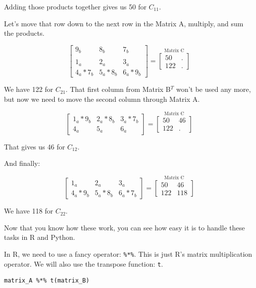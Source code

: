 \documentclass[
  letterpaper,
]{krantz}
\begin{document}
Adding those products together gives us 50 for \(C_{11}\).

Let's move that row down to the next row in the Matrix A, multiply, and
sum the products.

\[
\begin{bmatrix}
9_{b} & 8_{b} & 7_{b} \\
\\
1_{a} & 2_{a} & 3_{a}\\
4_{a}*7_{b} & 5_{a}*8_{b} & 6_{a}*9_{b}
\end{bmatrix}
= 
\stackrel{\mbox{Matrix C}}{
\begin{bmatrix}
50 & .\\
122 & .
\end{bmatrix}
}
\]

We have 122 for \(C_{21}\). That first column from Matrix B\(^T\) won't
be used any more, but now we need to move the second column through
Matrix A.

\[
\begin{bmatrix}
1_{a}*9_{b} & 2_{a}*8_{b} & 3_{a}*7_{b}\\
4_{a} & 5_{a} & 6_{a}
\end{bmatrix}
= 
\stackrel{\mbox{Matrix C}}{
\begin{bmatrix}
50 & 46\\
122 & .
\end{bmatrix}
}
\]

That gives us 46 for \(C_{12}\).

And finally:

\[
\begin{bmatrix}
1_{a} & 2_{a} & 3_{a}\\
4_{a}*9_{b} & 5_{a}*8_{b} & 6_{a}*7_{b}
\end{bmatrix}
=
\stackrel{\mbox{Matrix C}}{
\begin{bmatrix}
50 & 46\\
122 & 118
\end{bmatrix}
}
\]

We have 118 for \(C_{22}\).

Now that you know how these work, you can see how easy it is to handle
these tasks in R and Python.

In R, we need to use a fancy operator: \texttt{\%*\%}. This is just R's
matrix multiplication operator. We will also use the transpose function:
\texttt{t}.

\begin{verbatim}
matrix_A %*% t(matrix_B)
\end{verbatim}
\end{document}
